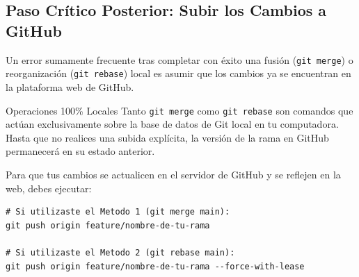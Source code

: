 \documentclass[
10pt, %
a4paper, %
oneside, %
headinclude,footinclude, %
BCOR5mm, %
]{scrartcl}
\begin{document}
\subsection{Paso Crítico Posterior: Subir los Cambios a GitHub}
Un error sumamente frecuente tras completar con éxito una fusión (\texttt{git merge}) o reorganización (\texttt{git rebase}) local es asumir que los cambios ya se encuentran en la plataforma web de GitHub.

\begin{WarningBox}{Operaciones 100\% Locales}
	Tanto \texttt{git merge} como \texttt{git rebase} son comandos que actúan exclusivamente sobre la base de datos de Git local en tu computadora. Hasta que no realices una subida explícita, la versión de la rama en GitHub permanecerá en su estado anterior.
\end{WarningBox}

Para que tus cambios se actualicen en el servidor de GitHub y se reflejen en la web, debes ejecutar:

\begin{lstlisting}[language=DOS]
# Si utilizaste el Metodo 1 (git merge main):
git push origin feature/nombre-de-tu-rama

# Si utilizaste el Metodo 2 (git rebase main):
git push origin feature/nombre-de-tu-rama --force-with-lease
\end{lstlisting}
\end{document}
